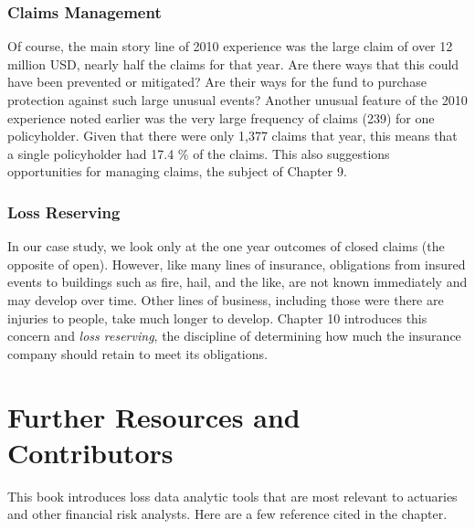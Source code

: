 \documentclass[]{book}
\theoremstyle{definition}
\theoremstyle{definition}
\theoremstyle{definition}
\theoremstyle{remark}
\begin{document}
\subsubsection*{Claims Management}\label{claims-management}

Of course, the main story line of 2010 experience was the large claim of
over 12 million USD, nearly half the claims for that year. Are there
ways that this could have been prevented or mitigated? Are their ways
for the fund to purchase protection against such large unusual events?
Another unusual feature of the 2010 experience noted earlier was the
very large frequency of claims (239) for one policyholder. Given that
there were only 1,377 claims that year, this means that a single
policyholder had 17.4 \% of the claims. This also suggestions
opportunities for managing claims, the subject of Chapter 9.

\subsubsection*{Loss Reserving}\label{loss-reserving}

In our case study, we look only at the one year outcomes of closed
claims (the opposite of open). However, like many lines of insurance,
obligations from insured events to buildings such as fire, hail, and the
like, are not known immediately and may develop over time. Other lines
of business, including those were there are injuries to people, take
much longer to develop. Chapter 10 introduces this concern and
\emph{loss reserving}, the discipline of determining how much the
insurance company should retain to meet its obligations.

\section{Further Resources and
Contributors}\label{further-reading-and-resources}

This book introduces loss data analytic tools that are most relevant to
actuaries and other financial risk analysts. Here are a few reference
cited in the chapter.
\end{document}
